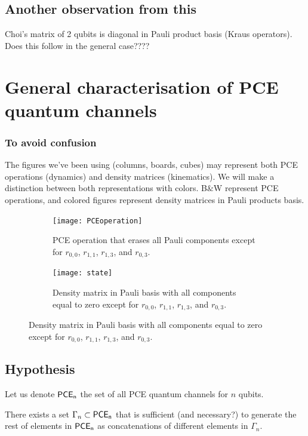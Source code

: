 \subsection{Another observation from this} %
Choi's matrix of 2 qubits is diagonal in Pauli product basis
(Kraus operators). Does this follow in the general case???? 
\section{General characterisation of PCE quantum channels} %
\subsubsection*{To avoid confusion} %
The figures we've been using (columns, boards, cubes) may represent
both PCE operations (dynamics) and density matrices (kinematics). We
will make a distinction between both representations with colors.
B$\&$W represent PCE operations, and colored figures represent 
density matrices in Pauli products basis.
\begin{figure}[H]
\begin{subfigure}{.5\textwidth}
\centering
\texttt{[image: PCEoperation]}
\caption{PCE operation that erases all Pauli components except 
for $r_{0,0}$, $r_{1,1}$, $r_{1,3}$, and $r_{0,3}$.}
\end{subfigure}
\begin{subfigure}{.5\textwidth}
\centering
\texttt{[image: state]}
\caption{Density matrix in Pauli basis with all components equal
to zero except for $r_{0,0}$, $r_{1,1}$, $r_{1,3}$, and $r_{0,3}$.}
\end{subfigure}
\end{figure}

\subsection*{Hypothesis} %
Let us denote $\mathsf{PCE}_\mathsf{n}$ the set of all PCE quantum channels for 
$n$ qubits.
\begin{conj}{}
There exists a set $\Gamma_n\subset\mathsf{PCE}_\mathsf{n}$ that is sufficient (and 
necessary?) to generate the rest of elements in $\mathsf{PCE}_\mathsf{n}$ as 
concatenations of different elements in $\Gamma_n$.
\end{conj}

